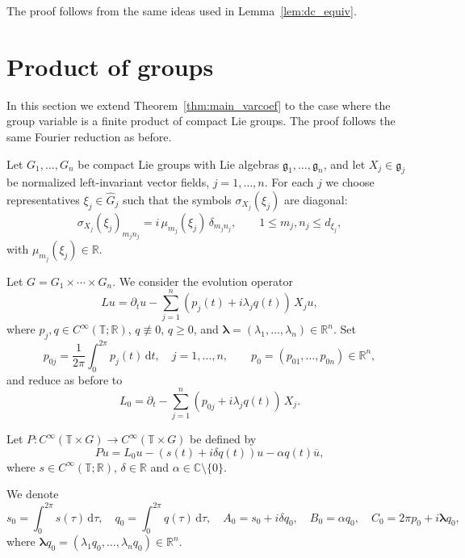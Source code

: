 \documentclass[11pt,reqno]{amsart}
\numberwithin{equation}{section}
\begin{document}
	The proof follows from the same ideas used in Lemma~\ref{lem:dc_equiv}.
	
	\section{Product of groups}\label{sec:product}
	
	In this section we extend Theorem~\ref{thm:main_varcoef} to the case where the group variable is a finite product of compact Lie groups. The proof follows the same Fourier reduction as before.
	
	Let $G_1,\dots,G_n$ be compact Lie groups with Lie algebras $\mathfrak{g}_1,\dots,\mathfrak{g}_n$, and let $X_j\in\mathfrak{g}_j$ be normalized left-invariant vector fields, $j=1,\dots,n$. For each $j$ we choose representatives $\xi_j\in\widehat{G}_j$ such that the symbols $\sigma_{X_j}(\xi_j)$ are diagonal:
	\[
	\sigma_{X_j}(\xi_j)_{m_j n_j}= i\,\mu_{m_j}(\xi_j)\,\delta_{m_j n_j},
	\qquad 1\le m_j,n_j\le d_{\xi_j},
	\]
	with $\mu_{m_j}(\xi_j)\in\mathbb{R}$.
	
	Let $G=G_1\times\cdots\times G_n$. We consider the evolution operator
	\[
	Lu=\partial_t u-\sum_{j=1}^n (p_j(t)+i\lambda_j q(t))\,X_j u,
	\]
	where $p_j,q\in C^\infty(\mathbb{T};\mathbb{R})$, $q\not\equiv 0$, $q\ge 0$, and $\boldsymbol{\lambda}=(\lambda_1,\dots,\lambda_n)\in\mathbb{R}^n$.
	Set
	\[
	p_{0j}=\frac{1}{2\pi}\int_0^{2\pi}p_j(t)\,\mathrm{d}t,\quad j=1,\dots,n,
	\qquad
	p_0=(p_{01},\dots,p_{0n})\in\mathbb{R}^n,
	\]
	and reduce as before to
	\[
	L_0=\partial_t-\sum_{j=1}^n (p_{0j}+i\lambda_j q(t))\,X_j.
	\]
	
	Let $P:C^\infty(\mathbb{T}\times G)\to C^\infty(\mathbb{T}\times G)$ be defined by
	\begin{equation}\label{eq:P_cvGn}
		Pu=L_0 u-(s(t)+i\delta q(t))u-\alpha q(t)\overline u,
	\end{equation}
	where $s\in C^\infty(\mathbb{T};\mathbb{R})$, $\delta\in\mathbb{R}$ and $\alpha\in\mathbb{C}\setminus\{0\}$.
	
	We denote
	\[
	s_0=\int_0^{2\pi}s(\tau)\,\mathrm{d}\tau,\quad
	q_0=\int_0^{2\pi}q(\tau)\,\mathrm{d}\tau,
	\quad
	A_0=s_0+i\delta q_0,\quad B_0=\alpha q_0,\quad C_0=2\pi p_0+i\boldsymbol{\lambda}q_0,
	\]
	where $\boldsymbol{\lambda}q_0=(\lambda_1 q_0,\dots,\lambda_n q_0)\in\mathbb{R}^n$.
	
\end{document}
